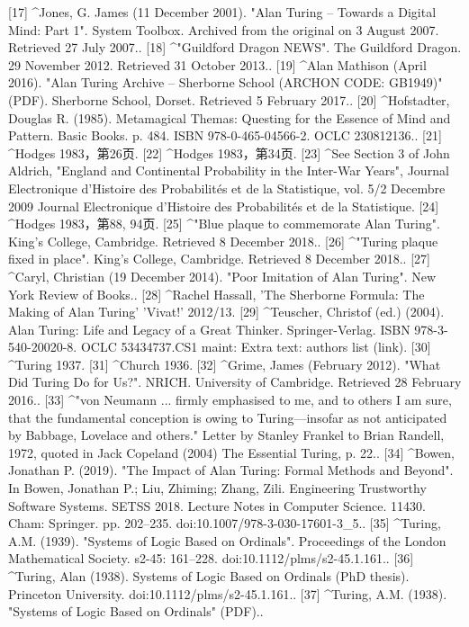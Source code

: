 [17]
^Jones, G. James (11 December 2001). "Alan Turing – Towards a Digital Mind: Part 1". System Toolbox. Archived from the original on 3 August 2007. Retrieved 27 July 2007..
[18]
^"Guildford Dragon NEWS". The Guildford Dragon. 29 November 2012. Retrieved 31 October 2013..
[19]
^Alan Mathison (April 2016). "Alan Turing Archive – Sherborne School (ARCHON CODE: GB1949)" (PDF). Sherborne School, Dorset. Retrieved 5 February 2017..
[20]
^Hofstadter, Douglas R. (1985). Metamagical Themas: Questing for the Essence of Mind and Pattern. Basic Books. p. 484. ISBN 978-0-465-04566-2. OCLC 230812136..
[21]
^Hodges 1983，第26页.
[22]
^Hodges 1983，第34页.
[23]
^See Section 3 of John Aldrich, "England and Continental Probability in the Inter-War Years", Journal Electronique d'Histoire des Probabilités et de la Statistique, vol. 5/2 Decembre 2009 Journal Electronique d'Histoire des Probabilités et de la Statistique.
[24]
^Hodges 1983，第88, 94页.
[25]
^"Blue plaque to commemorate Alan Turing". King's College, Cambridge. Retrieved 8 December 2018..
[26]
^"Turing plaque fixed in place". King's College, Cambridge. Retrieved 8 December 2018..
[27]
^Caryl, Christian (19 December 2014). "Poor Imitation of Alan Turing". New York Review of Books..
[28]
^Rachel Hassall, 'The Sherborne Formula: The Making of Alan Turing' 'Vivat!' 2012/13.
[29]
^Teuscher, Christof (ed.) (2004). Alan Turing: Life and Legacy of a Great Thinker. Springer-Verlag. ISBN 978-3-540-20020-8. OCLC 53434737.CS1 maint: Extra text: authors list (link).
[30]
^Turing 1937.
[31]
^Church 1936.
[32]
^Grime, James (February 2012). "What Did Turing Do for Us?". NRICH. University of Cambridge. Retrieved 28 February 2016..
[33]
^"von Neumann ... firmly emphasised to me, and to others I am sure, that the fundamental conception is owing to Turing—insofar as not anticipated by Babbage, Lovelace and others." Letter by Stanley Frankel to Brian Randell, 1972, quoted in Jack Copeland (2004) The Essential Turing, p. 22..
[34]
^Bowen, Jonathan P. (2019). "The Impact of Alan Turing: Formal Methods and Beyond". In Bowen, Jonathan P.; Liu, Zhiming; Zhang, Zili. Engineering Trustworthy Software Systems. SETSS 2018. Lecture Notes in Computer Science. 11430. Cham: Springer. pp. 202–235. doi:10.1007/978-3-030-17601-3_5..
[35]
^Turing, A.M. (1939). "Systems of Logic Based on Ordinals". Proceedings of the London Mathematical Society. s2-45: 161–228. doi:10.1112/plms/s2-45.1.161..
[36]
^Turing, Alan (1938). Systems of Logic Based on Ordinals (PhD thesis). Princeton University. doi:10.1112/plms/s2-45.1.161..
[37]
^Turing, A.M. (1938). "Systems of Logic Based on Ordinals" (PDF)..
